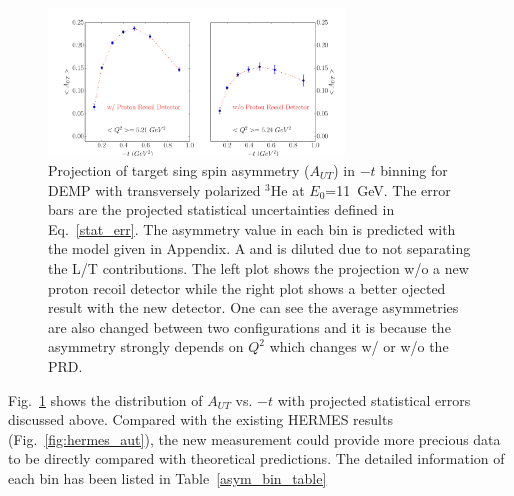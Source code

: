 \begin{figure}[!ht]
 \begin{center}
      \includegraphics[type=pdf,
        ext=.pdf,read=.pdf,width=0.7\textwidth]{./figures/bin_asym_t}
      \caption{\footnotesize{Projection of target sing spin asymmetry
          ($A_{UT}$) in $-t$ binning for DEMP with transversely polarized
          $\mathrm{^{3}He}$ at $E_{0}$=11~GeV. The error bars are the projected
          statistical uncertainties defined in Eq.~\ref{stat_err}. The
          asymmetry value in each bin is predicted with the model given in Appendix. A and is diluted due to not separating the L/T
          contributions. The left plot shows the projection w/o a new proton
          recoil detector while the right plot shows a better ojected result
          with the new detector. One can see the average asymmetries are also
          changed between two configurations and it is because the asymmetry
          strongly depends on $Q^{2}$ which changes w/ or w/o the PRD.}}
  \label{asym_t}
  \end{center}
\end{figure}
Fig.~\ref{asym_t} shows the distribution of $A_{UT}$ vs. $-t$ with projected
statistical errors discussed above. Compared with the existing HERMES results
(Fig.~\ref{fig:hermes_aut}), the new measurement could provide more precious
data to be directly compared with theoretical predictions. The detailed information of each bin has been listed in Table~\ref{asym_bin_table}

